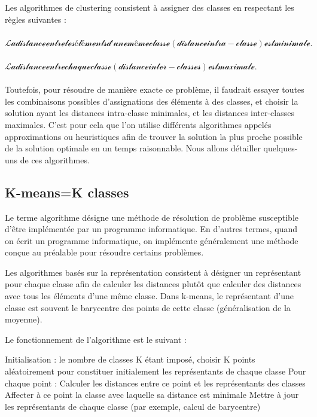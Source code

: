 \documentclass[11pt,twoside,openany,x11names,svgnames]{memoir}
\begin{document}
\begin{itemize}
\begin{itemize}
		Les algorithmes de clustering consistent à assigner des classes en respectant les règles suivantes :\paragraph{}

\bullet $\mathcal{    La distance entre les éléments d’une même classe (distance intra-classe) est minimale.}$ \paragraph{}
\bullet $\mathcal{   La distance entre chaque classe (distance inter-classes) est maximale.}$  \paragraph{}


Toutefois, pour résoudre de manière exacte ce problème, il faudrait essayer toutes les combinaisons possibles d’assignations des éléments à des classes, et choisir la solution ayant les distances intra-classe minimales, et les distances inter-classes maximales. C’est pour cela que l’on utilise différents algorithmes appelés approximations ou heuristiques afin de trouver la solution la plus proche possible de la solution optimale en un temps raisonnable. Nous allons détailler quelques-uns de ces algorithmes.
				
				\subsection{K-means=K classes}
				
				Le terme algorithme désigne une méthode de résolution de problème susceptible d'être implémentée par un programme informatique. En d'autres termes, quand on écrit un programme informatique, on implémente généralement une méthode conçue au préalable pour résoudre certains problèmes.
				
				Les algorithmes basés sur la représentation consistent à désigner un représentant pour chaque classe afin de calculer les distances plutôt que calculer des distances avec tous les éléments d’une même classe. Dans k-means, le représentant d’une classe est souvent le barycentre des points de cette classe (généralisation de la moyenne).

Le fonctionnement de l’algorithme est le suivant :

Initialisation : le nombre de classes K étant imposé, choisir K points aléatoirement pour constituer initialement les représentants de chaque classe
Pour chaque point :
Calculer les distances entre ce point et les représentants des classes
Affecter à ce point la classe avec laquelle sa distance est minimale
Mettre à jour les représentants de chaque classe (par exemple, calcul de barycentre)
   

\end{itemize}
\end{itemize}
\end{document}
